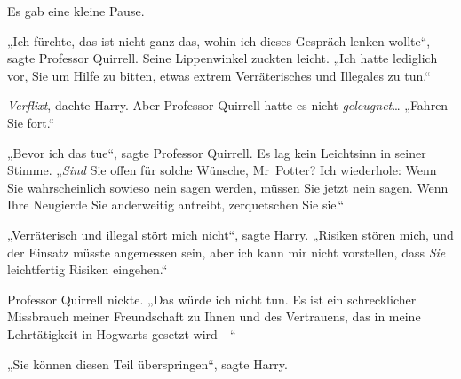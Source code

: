 Es gab eine kleine Pause.

„Ich fürchte, das ist nicht ganz das, wohin ich dieses Gespräch lenken wollte“, sagte Professor Quirrell. Seine Lippenwinkel zuckten leicht.
„Ich hatte lediglich vor, Sie um Hilfe zu bitten, etwas extrem Verräterisches und Illegales zu tun.“

\emph{Verflixt}, dachte Harry. Aber Professor Quirrell hatte es nicht \emph{geleugnet}…
„Fahren Sie fort.“

„Bevor ich das tue“, sagte Professor Quirrell. Es lag kein Leichtsinn in seiner Stimme. „\emph{Sind} Sie offen für solche Wünsche, Mr~Potter? Ich wiederhole: Wenn Sie wahrscheinlich sowieso nein sagen werden, müssen Sie jetzt nein sagen. Wenn Ihre Neugierde Sie anderweitig antreibt, zerquetschen Sie sie.“

„Verräterisch und illegal stört mich nicht“, sagte Harry.
„Risiken stören mich, und der Einsatz müsste angemessen sein, aber ich kann mir nicht vorstellen, dass \emph{Sie} leichtfertig Risiken eingehen.“

Professor Quirrell nickte.
„Das würde ich nicht tun. Es ist ein schrecklicher Missbrauch meiner Freundschaft zu Ihnen und des Vertrauens, das in meine Lehrtätigkeit in Hogwarts gesetzt wird—“

„Sie können diesen Teil überspringen“, sagte Harry.

